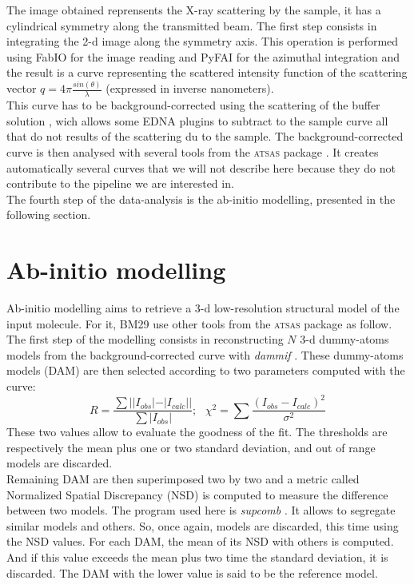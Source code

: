 \documentclass[a4paper, 11pt]{report}
\begin{document}
The image obtained reprensents the X-ray scattering by the sample, it 
has a cylindrical symmetry along the transmitted beam. 
The first step consists in integrating the 2-d image along the 
symmetry axis. 
This operation is performed using FabIO \cite{fabio} for the image 
reading and PyFAI \cite{pyFAI} for the azimuthal integration and the 
result is a curve representing the scattered intensity function of the 
scattering vector $q = 4 \pi \frac{sin(\theta)}{\lambda}$ (expressed 
in inverse nanometers).\\

This curve has to be background-corrected using the scattering of the 
buffer solution , wich allows some EDNA plugins to subtract to the 
sample curve all that do not results of the scattering du to the 
sample. 
The background-corrected curve is then analysed with several tools 
from the \textsc{atsas} package \cite{atsas}. 
It creates automatically several curves that we will not describe here 
because they do not contribute to the pipeline we are interested in.\\

The fourth step of the data-analysis is the ab-initio modelling, 
presented in the following section.

\section{Ab-initio modelling}
\label{modelling}                           %

Ab-initio modelling aims to retrieve a 3-d low-resolution structural 
model of the input molecule. 
For it, BM29 use other tools from the \textsc{atsas} package as 
follow.\\

The first step of the modelling consists in reconstructing $N$ 3-d 
dummy-atoms models from the background-corrected curve with 
\textit{dammif} \cite{dammif}. %
These dummy-atoms models (DAM) are then selected according to two 
parameters computed with the curve: 
\[
R = \frac {\sum {||I_{obs}| - |I_{calc}||}}{\sum {|I_{obs}|}}; \ \ \ 
\chi^{2} = \sum {\frac {(I_{obs} - I_{calc})^{2}}{\sigma^{2}}}
\]
These two values allow to evaluate the goodness of the fit. 
The thresholds are respectively the mean plus one or two standard 
deviation, and out of range models are discarded.\\

Remaining DAM are then superimposed two by two and a metric called 
Normalized Spatial Discrepancy (NSD) is computed to measure the 
difference between two models. 
The program used here is \textit{supcomb} \cite{supcomb}. 
It allows to segregate similar models and others. 
So, once again, models are discarded, this time using the NSD values. 
For each DAM, the mean of its NSD with others is computed. 
And if this value exceeds the mean plus two time the standard 
deviation, it is discarded. 
The DAM with the lower value is said to be the reference model.\\
\end{document}

